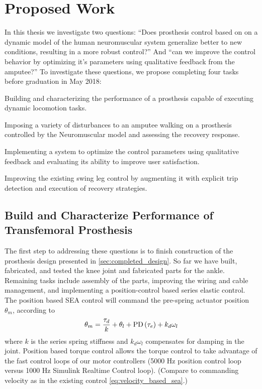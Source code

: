 \chapter{Proposed Work}

In this thesis we investigate two questions: ``Does prosthesis control based on
on a dynamic model of the human neuromuscular system generalize better to new
conditions, resulting in a more robust control?'' And ``can we improve the
control behavior by optimizing it's parameters using qualitative feedback from
the amputee?'' To investigate these questions, we propose completing four tasks
before graduation in May 2018: 
\begin{proposed_works} 
    \item[\Cref{sec:proposed_build}] Building and characterizing the performance
    of a prosthesis capable of executing dynamic locomotion tasks.

    \item[\Cref{sec:proposed_evaluate}] Imposing a variety of disturbances to an
    amputee walking on a prosthesis controlled by the Neuromuscular model and
    assessing the recovery response.

    \item[\Cref{sec:proposed_optimize}] Implementing a system to optimize the
    control parameters using qualitative feedback and evaluating its ability to
    improve user satisfaction.

    \item[\Cref{sec:proposed_trip_class}] Improving the existing swing leg
    control by augmenting it with explicit trip detection and execution of
    recovery strategies.
\end{proposed_works} 

\section{Build and Characterize Performance of Transfemoral
Prosthesis}\label{sec:proposed_build}

The first step to addressing these questions is to finish construction of the
prosthesis design presented in \cref{sec:completed_design}. So far we have
built, fabricated, and tested the knee joint and fabricated parts for the ankle.
Remaining tasks include assembly of the parts, improving the wiring and cable
management, and implementing a position-control based series elastic control.
The position based SEA control will command the pre-spring actuator position
$\theta_m$, according to
\begin{align}
    \theta_m = \frac{\tau_d}{k} + \theta_l + \func{PD}{\tau_e} + k_d \omega_l
\end{align}
where $k$ is the series spring stiffness and $k_d \omega_l$ compensates for
damping in the joint. Position based torque control allows the torque control to
take advantage of the fast control loops of our motor controllers (5000 Hz
position control loop versus 1000 Hz Simulink Realtime Control loop). (Compare
to commanding velocity as in the existing control \cref{eq:velocity_based_sea}.)

